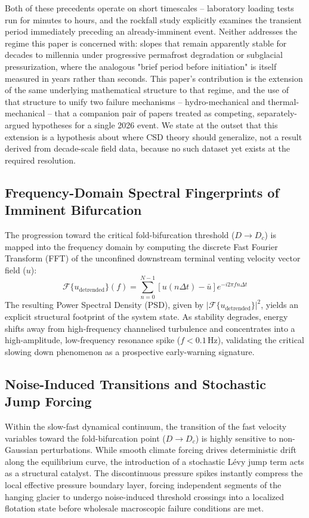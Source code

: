 \documentclass[11pt,twocolumn]{article}
\begin{document}
Both of these precedents operate on short timescales -- laboratory loading tests run for minutes to hours, and the rockfall study explicitly examines the transient period immediately preceding an already-imminent event. Neither addresses the regime this paper is concerned with: slopes that remain apparently stable for decades to millennia under progressive permafrost degradation or subglacial pressurization, where the analogous "brief period before initiation" is itself measured in years rather than seconds. This paper's contribution is the extension of the same underlying mathematical structure to that regime, and the use of that structure to unify two failure mechanisms -- hydro-mechanical and thermal-mechanical -- that a companion pair of papers treated as competing, separately-argued hypotheses for a single 2026 event. We state at the outset that this extension is a hypothesis about where CSD theory should generalize, not a result derived from decade-scale field data, because no such dataset yet exists at the required resolution.
\subsection{Frequency-Domain Spectral Fingerprints of Imminent Bifurcation}
The progression toward the critical fold-bifurcation threshold ($D \to D_c$) is mapped into the frequency domain by computing the discrete Fast Fourier Transform (FFT) of the unconfined downstream terminal venting velocity vector field ($u$):
\begin{equation}
\mathcal{F}\{u_{\text{detrended}}\}(f) = \sum_{n=0}^{N-1} [u(n\Delta t) - \bar{u}] e^{-i 2 \pi f n \Delta t}
\end{equation}
The resulting Power Spectral Density (PSD), given by $|\mathcal{F}\{u_{\text{detrended}}\}|^2$, yields an explicit structural footprint of the system state. As stability degrades, energy shifts away from high-frequency channelised turbulence and concentrates into a high-amplitude, low-frequency resonance spike ($f < 0.1$\,Hz), validating the critical slowing down phenomenon as a prospective early-warning signature.
\subsection{Noise-Induced Transitions and Stochastic Jump Forcing}
Within the slow-fast dynamical continuum, the transition of the fast velocity variables toward the fold-bifurcation point ($D \to D_c$) is highly sensitive to non-Gaussian perturbations. While smooth climate forcing drives deterministic drift along the equilibrium curve, the introduction of a stochastic Lévy jump term acts as a structural catalyst. The discontinuous pressure spikes instantly compress the local effective pressure boundary layer, forcing independent segments of the hanging glacier to undergo noise-induced threshold crossings into a localized flotation state before wholesale macroscopic failure conditions are met.
\end{document}
